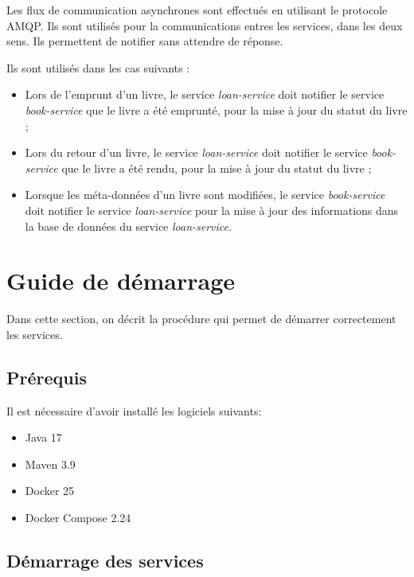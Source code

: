 \documentclass[
  french,
  a4paper,
]{scrartcl}
\begin{document}
Les flux de communication asynchrones sont effectués en utilisant le protocole AMQP. Ils sont
utilisés pour la communications entres les services, dans les deux sens. Ils permettent 
de notifier sans attendre de réponse. 

Ils sont utilisés dans les cas suivants : 

\begin{itemize}
  \item Lors de l'emprunt d'un livre, le service \textit{loan-service} doit notifier le service
    \textit{book-service} que le livre a été emprunté, pour la mise à jour du statut du livre ; 
    
  \item Lors du retour d'un livre, le service \textit{loan-service} doit notifier le service
    \textit{book-service} que le livre a été rendu, pour la mise à jour du statut du livre ; 

  \item Lorsque les méta-données d'un livre sont modifiées, le service \textit{book-service} doit
    notifier le service \textit{loan-service} pour la mise à jour des informations dans la base de données
    du service \textit{loan-service}.
\end{itemize}



\section{Guide de démarrage}

Dans cette section, on décrit la procédure qui permet de démarrer correctement les services. 

\subsection{Prérequis}

Il est nécessaire d'avoir installé les logiciels suivants:

\begin{itemize}
  \item Java 17
  \item Maven 3.9
  \item Docker 25
  \item Docker Compose 2.24
\end{itemize}

\subsection{Démarrage des services}
\end{document}

